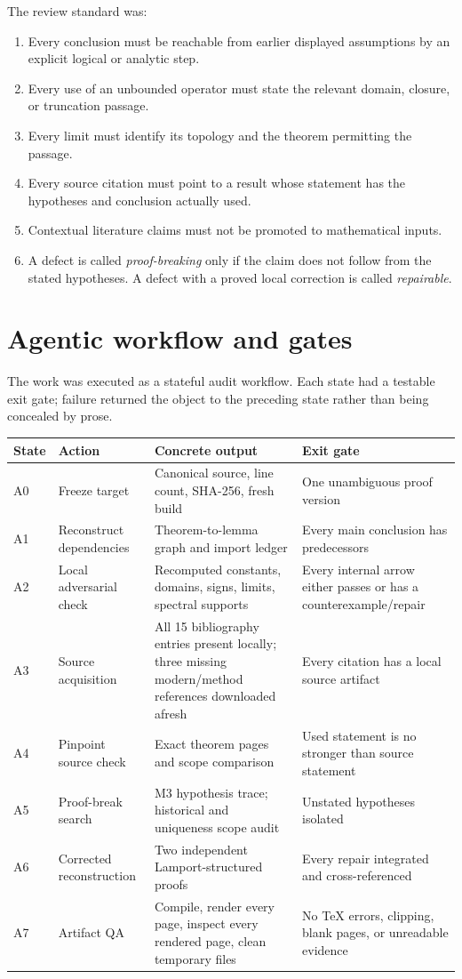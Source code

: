 \documentclass[10pt,a4paper]{article}
\begin{document}
The review standard was:

\begin{enumerate}[label=\textup{R\arabic*.}]
\item Every conclusion must be reachable from earlier displayed assumptions by an explicit
logical or analytic step.
\item Every use of an unbounded operator must state the relevant domain, closure, or
truncation passage.
\item Every limit must identify its topology and the theorem permitting the passage.
\item Every source citation must point to a result whose statement has the hypotheses and
conclusion actually used.
\item Contextual literature claims must not be promoted to mathematical inputs.
\item A defect is called \emph{proof-breaking} only if the claim does not follow from the
stated hypotheses.  A defect with a proved local correction is called \emph{repairable}.
\end{enumerate}

\section{Agentic workflow and gates}

The work was executed as a stateful audit workflow.  Each state had a testable exit gate;
failure returned the object to the preceding state rather than being concealed by prose.

\begin{longtable}{P{1.2cm}P{3.0cm}P{5.4cm}P{4.3cm}}
\toprule
State & Action & Concrete output & Exit gate\\
\midrule
\endhead
A0 & Freeze target & Canonical source, line count, SHA-256, fresh build & One unambiguous proof version\\
A1 & Reconstruct dependencies & Theorem-to-lemma graph and import ledger & Every main conclusion has predecessors\\
A2 & Local adversarial check & Recomputed constants, domains, signs, limits, spectral supports & Every internal arrow either passes or has a counterexample/repair\\
A3 & Source acquisition & All 15 bibliography entries present locally; three missing modern/method references downloaded afresh & Every citation has a local source artifact\\
A4 & Pinpoint source check & Exact theorem pages and scope comparison & Used statement is no stronger than source statement\\
A5 & Proof-break search & M3 hypothesis trace; historical and uniqueness scope audit & Unstated hypotheses isolated\\
A6 & Corrected reconstruction & Two independent Lamport-structured proofs & Every repair integrated and cross-referenced\\
A7 & Artifact QA & Compile, render every page, inspect every rendered page, clean temporary files & No TeX errors, clipping, blank pages, or unreadable evidence\\
\bottomrule
\end{longtable}
\end{document}
